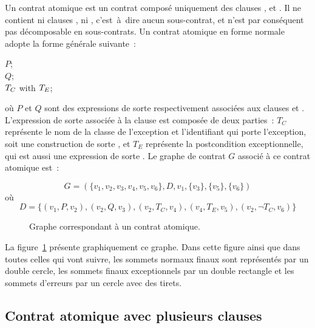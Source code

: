 Un {\strong contrat atomique} est un contrat composé uniquement des clauses
\arequires, \aensures et \athrowable. Il ne contient ni clauses \abehavior, ni
\adefault, c'est~à~dire aucun sous-contrat, et n'est par conséquent pas
décomposable en sous-contrats. Un contrat atomique en forme normale adopte
la forme générale suivante~:
%
\begin{pre}
\arequires  \(P\); \\
\aensures   \(Q\); \\
\athrowable \(T\sb{C}\) with \(T\sb{E}\);
\end{pre}
%
où $P$ et $Q$ sont des expressions de sorte  respectivement
associées aux clauses \arequires et \aensures. L'expression de sorte
 associée à la clause \athrowable est composée de
deux parties~: $T_C$ représente le nom de la classe de l'exception et
l'identifiant qui porte l'exception, soit une construction de sorte
, et $T_E$ représente la postcondition
exceptionnelle, qui est aussi une expression de sorte . Le
graphe de contrat $G$ associé à ce contrat atomique est~:


$$G = (
  \{v_1, v_2, v_3, v_4, v_5, v_6\},
  D,
  v_1,
  \{v_3\},
  \{v_5\},
  \{v_6\}
)$$
%
où
%
$$D = \{
  (v_1, P, v_2),
  (v_2, Q, v_3),
  (v_2, T_C, v_4),
  (v_4, T_E, v_5),
  (v_2, \neg T_C, v_6)
\}$$

\begin{figure}


\caption{\label{figure:test:atomic_graph} Graphe correspondant à un contrat
atomique.}

\end{figure}

\begin{example}

La figure~\ref{figure:test:atomic_graph} présente graphiquement ce graphe. Dans
cette figure ainsi que dans toutes celles qui vont suivre, les sommets normaux
finaux sont représentés par un double cercle, les sommets finaux
exceptionnels par un double rectangle et les sommets d'erreurs par un cercle
avec des tirets.

\end{example}

\subsection{Contrat atomique avec plusieurs clauses \athrowable}
\label{subsection:test:throwable_graph}

